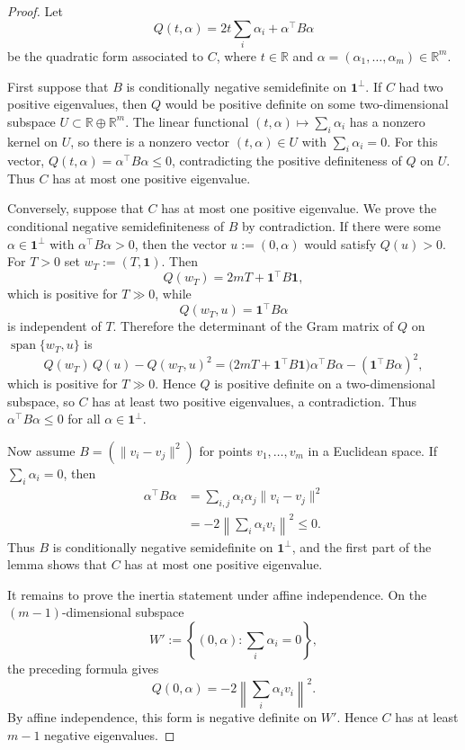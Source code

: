 \documentclass[12pt]{amsart}
\theoremstyle{definition}
\newcommand{\1}{\mathbf{1}}
\newcommand\R{{\mathbb R}}
\begin{document}
\begin{proof}
Let
\[
        Q(t,\alpha)
        =
        2t\sum_i\alpha_i+\alpha^\top B\alpha
\]
be the quadratic form associated to $C$, where $t\in\R$ and
$\alpha=(\alpha_1,\dots,\alpha_m)\in\R^m$.

First suppose that $B$ is conditionally negative semidefinite on $\1^\perp$.  If
$C$ had two positive eigenvalues, then $Q$ would be positive definite on some
two-dimensional subspace $U\subset \R\oplus\R^m$.  The linear functional $(t,\alpha)\longmapsto \sum_i\alpha_i$
has a nonzero kernel on $U$, so there is a nonzero vector $(t,\alpha)\in U$ with
$\sum_i\alpha_i=0$.  For this vector, $Q(t,\alpha)=\alpha^\top B\alpha\le0$,
contradicting the positive definiteness of $Q$ on $U$.  Thus $C$ has at most one
positive eigenvalue.

Conversely, suppose that $C$ has at most one positive eigenvalue.  We prove the
conditional negative semidefiniteness of $B$ by contradiction.  If there were some
$\alpha\in\1^\perp$ with $\alpha^\top B\alpha>0$, then the vector $u:=(0,\alpha)$
would satisfy $Q(u)>0$.  For $T>0$ set $w_T:=(T,\1)$.
Then
\[
        Q(w_T)=2mT+\1^\top B\1,
\]
which is positive for $T\gg0$, while
\[
        Q(w_T,u)=\1^\top B\alpha
\]
is independent of $T$.  Therefore the determinant of the Gram matrix of $Q$ on
$\operatorname{span}\{w_T,u\}$ is
\[
        Q(w_T)\,Q(u)-Q(w_T,u)^2
        =
        \bigl(2mT+\1^\top B\1\bigr)\alpha^\top B\alpha
        -
        (\1^\top B\alpha)^2,
\]
which is positive for $T\gg0$.  Hence $Q$ is positive definite on a two-dimensional
subspace, so $C$ has at least two positive eigenvalues, a contradiction.  Thus
$\alpha^\top B\alpha\le0$ for all $\alpha\in\1^\perp$.

Now assume $B=(\|v_i-v_j\|^2)$ for points $v_1,\dots,v_m$ in a Euclidean space.  If
$\sum_i\alpha_i=0$, then
\[
\begin{aligned}
        \alpha^\top B\alpha
        &=
        \sum_{i,j}\alpha_i\alpha_j\|v_i-v_j\|^2        \\
        &=
        -2\left\|\sum_i\alpha_i v_i\right\|^2
        \le0.
\end{aligned}
\]
Thus $B$ is conditionally negative semidefinite on $\1^\perp$, and the first part of
the lemma shows that $C$ has at most one positive eigenvalue.

It remains to prove the inertia statement under affine independence.  On the
$(m-1)$-dimensional subspace
\[
        W':=\left\{(0,\alpha):\sum_i\alpha_i=0\right\},
\]
the preceding formula gives
\[
        Q(0,\alpha)
        =
        -2\left\|\sum_i\alpha_i v_i\right\|^2.
\]
By affine independence, this form is negative definite on $W'$.  Hence $C$ has at
least $m-1$ negative eigenvalues.


\end{proof}
\end{document}
